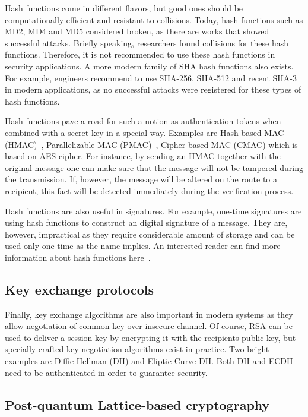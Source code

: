 Hash functions come in different flavors, but good ones should be computationally 
efficient and resistant to collisions. Today, hash functions such as MD2, MD4 and MD5 
considered broken, as there are works that showed successful attacks. Briefly speaking, 
researchers found collisions for these hash functions. Therefore, it is 
not recommended to use these hash functions in security applications. A more modern 
family of SHA hash functions also exists. For example, engineers recommend to use SHA-256, 
SHA-512 and recent SHA-3 in modern applications, as no successful attacks were registered for 
these types of hash functions.

Hash functions pave a road for such a notion as authentication tokens when combined with a 
secret key in a special way. Examples are Hash-based MAC (HMAC)~\cite{Stinson:Cryptography}, 
Parallelizable MAC (PMAC)~\cite{pmac}, Cipher-based MAC (CMAC) which is based on AES cipher. 
For instance, by sending an HMAC together with the original message one can make sure that 
the message will not be tampered during the transmission. If, however, the message will 
be altered on the route to a recipient, this fact will be detected immediately during the 
verification process.

Hash functions are also useful in signatures. For example, one-time signatures are using 
hash functions to construct an digital signature of a message. They are, however, impractical
as they require considerable amount of storage and can be used only one time as the name implies. 
An interested reader can find more information about hash functions here~\cite{Stinson:Cryptography}.

\subsection{Key exchange protocols}

Finally, key exchange algorithms are also important in modern systems as they allow 
negotiation of common key over insecure channel. Of course, RSA can be used to deliver a session key
by encrypting it with the recipients public key, but specially crafted key negotiation
algorithms exist in practice. Two bright examples are Diffie-Hellman (DH) and Eliptic Curve 
DH. Both DH and ECDH need to be authenticated in order to guarantee security.


\subsection{Post-quantum Lattice-based cryptography}

